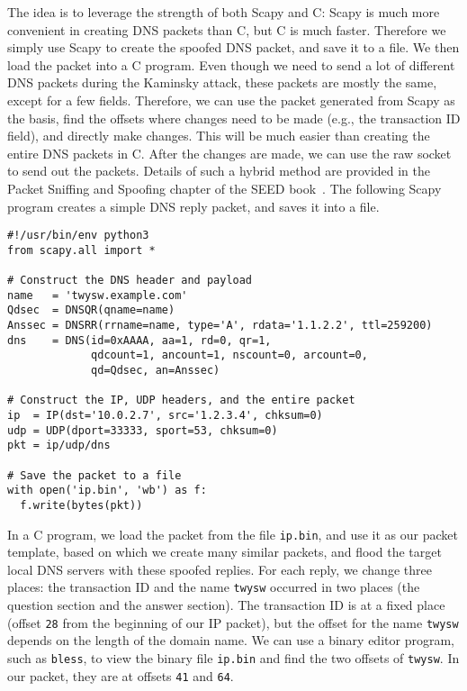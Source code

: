 The idea is to leverage the strength of both Scapy and C: Scapy is much more convenient in
creating DNS packets than C, but C is much faster. Therefore we simply
use Scapy to create the spoofed DNS packet, and save it to a file.
We then load the packet into a C program. Even though we need to send a 
lot of different DNS packets
during the Kaminsky attack, these packets are mostly the same, except for a few fields. 
Therefore, we can
use the packet generated from Scapy as the basis, find the offsets where
changes need to be made (e.g., the transaction ID field),
and directly make changes. This will be much easier than
creating the entire DNS packets in C.
After the changes are made, we can use the raw socket to send out the packets.
Details of such a hybrid method are provided in
the Packet Sniffing and Spoofing chapter 
of the SEED book~\cite{seedbook}.
The following Scapy program creates a simple DNS reply packet, 
and saves it into a file.


\begin{lstlisting}[caption={\texttt{generate\_dns\_reply.py}}]
#!/usr/bin/env python3
from scapy.all import *

# Construct the DNS header and payload
name   = 'twysw.example.com'
Qdsec  = DNSQR(qname=name)
Anssec = DNSRR(rrname=name, type='A', rdata='1.1.2.2', ttl=259200)
dns    = DNS(id=0xAAAA, aa=1, rd=0, qr=1, 
             qdcount=1, ancount=1, nscount=0, arcount=0, 
             qd=Qdsec, an=Anssec)

# Construct the IP, UDP headers, and the entire packet
ip  = IP(dst='10.0.2.7', src='1.2.3.4', chksum=0)
udp = UDP(dport=33333, sport=53, chksum=0)
pkt = ip/udp/dns

# Save the packet to a file
with open('ip.bin', 'wb') as f:
  f.write(bytes(pkt))
\end{lstlisting}

In a C program, we load the packet from the file \texttt{ip.bin}, and use
it as our packet template, based on which we create many similar packets,
and flood the target local DNS servers with these spoofed replies. For each
reply, we change three places: the transaction ID and the name
\texttt{twysw} occurred in two places (the question section and the answer
section).  The transaction ID is at a fixed place (offset  \texttt{28} from
the beginning of our IP packet), but the offset for the name \texttt{twysw}
depends on the length of the domain name. We can use a binary editor
program, such as \texttt{bless}, to view the binary file \texttt{ip.bin}
and find the two offsets of \texttt{twysw}. In our packet, they are at
offsets \texttt{41} and \texttt{64}.



